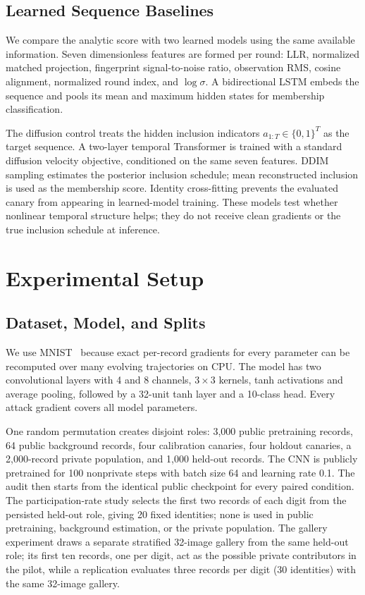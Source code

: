 \documentclass[conference]{IEEEtran}
\begin{document}
\subsection{Learned Sequence Baselines}

We compare the analytic score with two learned models using the same available information. Seven dimensionless features are formed per round: LLR, normalized matched projection, fingerprint signal-to-noise ratio, observation RMS, cosine alignment, normalized round index, and $\log\sigma$. A bidirectional LSTM embeds the sequence and pools its mean and maximum hidden states for membership classification.

The diffusion control treats the hidden inclusion indicators $a_{1:T}\in\{0,1\}^T$ as the target sequence. A two-layer temporal Transformer is trained with a standard diffusion velocity objective, conditioned on the same seven features. DDIM sampling estimates the posterior inclusion schedule; mean reconstructed inclusion is used as the membership score. Identity cross-fitting prevents the evaluated canary from appearing in learned-model training. These models test whether nonlinear temporal structure helps; they do not receive clean gradients or the true inclusion schedule at inference.

\section{Experimental Setup}

\subsection{Dataset, Model, and Splits}

We use MNIST~\cite{lecun1998gradient} because exact per-record gradients for every parameter can be recomputed over many evolving trajectories on CPU. The model has two convolutional layers with 4 and 8 channels, $3\times3$ kernels, tanh activations and average pooling, followed by a 32-unit tanh layer and a 10-class head. Every attack gradient covers all model parameters.

One random permutation creates disjoint roles: 3,000 public pretraining records, 64 public background records, four calibration canaries, four holdout canaries, a 2,000-record private population, and 1,000 held-out records. The CNN is publicly pretrained for 100 nonprivate steps with batch size 64 and learning rate 0.1. The audit then starts from the identical public checkpoint for every paired condition. The participation-rate study selects the first two records of each digit from the persisted held-out role, giving 20 fixed identities; none is used in public pretraining, background estimation, or the private population. The gallery experiment draws a separate stratified 32-image gallery from the same held-out role; its first ten records, one per digit, act as the possible private contributors in the pilot, while a replication evaluates three records per digit (30 identities) with the same 32-image gallery.
\end{document}
